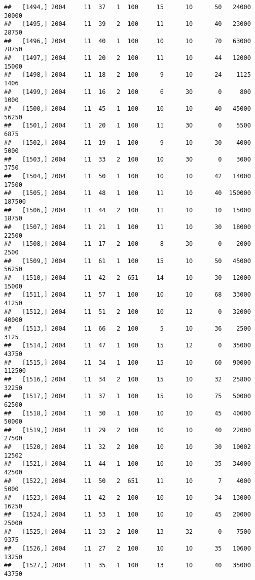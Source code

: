 \documentclass{article}\usepackage[]{graphicx}\usepackage[]{color}
\makeatletter
\newenvironment{kframe}{%
 \def\at@end@of@kframe{}%
 \ifinner\ifhmode%
  \def\at@end@of@kframe{\end{minipage}}%
  \begin{minipage}{\columnwidth}%
 \fi\fi%
 \def\FrameCommand##1{\hskip\@totalleftmargin \hskip-\fboxsep
 \colorbox{shadecolor}{##1}\hskip-\fboxsep
     \hskip-\linewidth \hskip-\@totalleftmargin \hskip\columnwidth}%
 \MakeFramed {\advance\hsize-\width
   \@totalleftmargin\z@ \linewidth\hsize
   \@setminipage}}%
 {\par\unskip\endMakeFramed%
 \at@end@of@kframe}
\newenvironment{knitrout}{}{} %
\makeatother
\begin{document}
\begin{knitrout}
\begin{kframe}
\begin{verbatim}
##   [1494,] 2004     11  37   1  100     15      10      50   24000   30000
##   [1495,] 2004     11  39   2  100     11      10      40   23000   28750
##   [1496,] 2004     11  40   1  100     10      10      70   63000   78750
##   [1497,] 2004     11  20   2  100     11      10      44   12000   15000
##   [1498,] 2004     11  18   2  100      9      10      24    1125    1406
##   [1499,] 2004     11  16   2  100      6      30       0     800    1000
##   [1500,] 2004     11  45   1  100     10      10      40   45000   56250
##   [1501,] 2004     11  20   1  100     11      30       0    5500    6875
##   [1502,] 2004     11  19   1  100      9      10      30    4000    5000
##   [1503,] 2004     11  33   2  100     10      30       0    3000    3750
##   [1504,] 2004     11  50   1  100     10      10      42   14000   17500
##   [1505,] 2004     11  48   1  100     11      10      40  150000  187500
##   [1506,] 2004     11  44   2  100     11      10      10   15000   18750
##   [1507,] 2004     11  21   1  100     11      10      30   18000   22500
##   [1508,] 2004     11  17   2  100      8      30       0    2000    2500
##   [1509,] 2004     11  61   1  100     15      10      50   45000   56250
##   [1510,] 2004     11  42   2  651     14      10      30   12000   15000
##   [1511,] 2004     11  57   1  100     10      10      68   33000   41250
##   [1512,] 2004     11  51   2  100     10      12       0   32000   40000
##   [1513,] 2004     11  66   2  100      5      10      36    2500    3125
##   [1514,] 2004     11  47   1  100     15      12       0   35000   43750
##   [1515,] 2004     11  34   1  100     15      10      60   90000  112500
##   [1516,] 2004     11  34   2  100     15      10      32   25800   32250
##   [1517,] 2004     11  37   1  100     15      10      75   50000   62500
##   [1518,] 2004     11  30   1  100     10      10      45   40000   50000
##   [1519,] 2004     11  29   2  100     10      10      40   22000   27500
##   [1520,] 2004     11  32   2  100     10      10      30   10002   12502
##   [1521,] 2004     11  44   1  100     10      10      35   34000   42500
##   [1522,] 2004     11  50   2  651     11      10       7    4000    5000
##   [1523,] 2004     11  42   2  100     10      10      34   13000   16250
##   [1524,] 2004     11  53   1  100     10      10      45   20000   25000
##   [1525,] 2004     11  33   2  100     13      32       0    7500    9375
##   [1526,] 2004     11  27   2  100     10      10      35   10600   13250
##   [1527,] 2004     11  35   1  100     13      10      40   35000   43750

\end{verbatim}
\end{kframe}
\end{knitrout}
\end{document}
